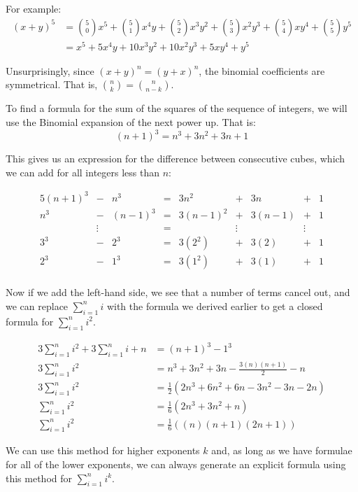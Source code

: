 \documentclass{article}
\begin{document}
For example:
\begin{align*}
	(x+y)^5 &= \binom{5}{0}x^5 + \binom{5}{1}x^4y + \binom{5}{2}x^3y^2 + 
	\binom{5}{3}x^2y^3 + \binom{5}{4}xy^4 + \binom{5}{5}y^5 \\
	 &= x^5 + 5x^4y + 10x^3y^2 + 10x^2y^3 + 5xy^4 + y^5
\end{align*}

Unsurprisingly, since $(x+y)^n = (y+x)^n$, the binomial coefficients are symmetrical.
That is, $\binom{n}{k} = \binom{n}{n-k}$.

To find a formula for the sum of the squares of the sequence of integers, we will use the
Binomial expansion of the next power up. That is:
\[(n+1)^3 = n^3 + 3n^2 + 3n + 1 \]

This gives us an expression for the difference between consecutive cubes, which we can add for
all integers less than $n$:

\begin{alignat*}{5}
	(n+1)^3 &-& n^3     &=& 3n^2     &+& 3n     &+& 1 \\
	n^3     &-& (n-1)^3 &=& 3(n-1)^2 &+& 3(n-1) &+& 1 \\
	      &\vdots&      &=&       &\vdots&  &\vdots& \\
	3^3     &-& 2^3     &=& 3(2^2)   &+& 3(2) &+& 1 \\
	2^3     &-& 1^3     &=& 3(1^2)   &+& 3(1) &+& 1 \\
\end{alignat*}

Now if we add the left-hand side, we see that a number of terms cancel out, and we can replace
$\sum_{i=1}^{n} i$ with the formula we derived earlier to get a closed formula for
$\sum_{i=1}^{n} i^2$.

\begin{align*}
	3\sum_{i=1}^{n} i^2 + 3\sum_{i=1}^{n} i + n &= (n+1)^3 - 1^3 \\
	3\sum_{i=1}^{n} i^2 &= n^3 +3n^2+3n - \frac{3(n)(n+1)}{2} - n \\
	3\sum_{i=1}^{n} i^2 &= \frac{1}{2}\left(2n^3 +6n^2+6n - 3n^2 -3n - 2n\right) \\
	\sum_{i=1}^{n} i^2  &= \frac{1}{6}\left(2n^3 +3n^2+n\right) \\
	\sum_{i=1}^{n} i^2  &= \frac{1}{6}\left((n)(n+1)(2n+1)\right) 
\end{align*} 

We can use this method for higher exponents $k$ and, as long as we have formulae for all 
of the lower exponents, we can always generate an explicit formula using this method for
$\sum_{i=1}^{n} i^k$.
\end{document}
